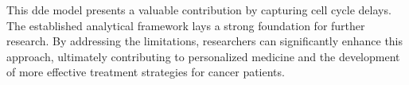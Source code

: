 This \gls{dde} model presents a valuable contribution by capturing cell cycle delays. The established analytical framework lays a strong foundation for further research. By addressing the limitations, researchers can significantly enhance this approach, ultimately contributing to personalized medicine and the development of more effective treatment strategies for cancer patients.






